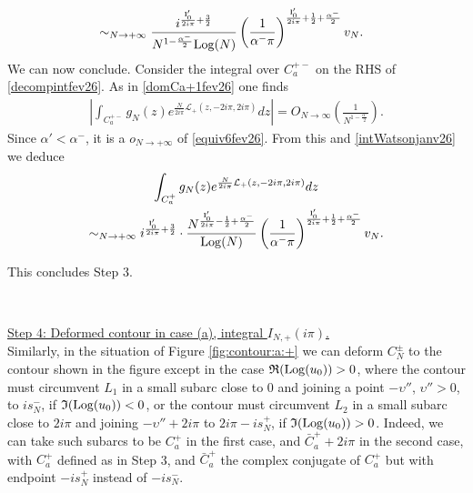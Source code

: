 \documentclass[11pt]{amsart}
\newcommand{\Log}{{\rm Log}}
\begin{document}
{\begin{align}
\notag
\\ & \sim_{N\to +\infty} \dfrac{i^{\frac{{\bf l}_0'}{2i\pi}+\frac{3}{2}}}{N^{1-\frac{\alpha^-}{2}}\Log(N)}\left(\frac{1}{\alpha^-\pi}\right)^{\frac{{\bf l}_0'}{2i\pi}+\frac{1}{2}+ \frac{\alpha^-}{2}}v_N.\label{equiv6fev26}
\end{align}
We can now conclude. Consider the integral over $C_a^{+-}$ on the RHS of \eqref{decompintfev26}. As in \eqref{domCa+1fev26} one finds
\begin{align*}\left \vert \int_{C_a^{+-}} g_N(z)e^{\frac{N}{2i\pi}\mathcal{L}_+(z,-2i\pi,2i\pi)}dz\right \vert = O_{N\to\infty}\left (\frac{1}{N^{1-\frac{\alpha'}{2}}}\right ).\end{align*}
Since $\alpha'< \alpha^-$, it is a $o_{N\to +\infty}$ of \eqref{equiv6fev26}. From this and \eqref{intWatsonjanv26} we deduce
\begin{multline}\label{intCa+8fev26}
\int_{C_a^+} g_N(z) e^{\frac{N}{2i\pi}\mathcal{L}_+(z,-2i\pi,2i\pi)}dz \\ \sim_{N\to +\infty} i^{\frac{{\bf l}_0'}{2i\pi}+\frac{3}{2}}\cdot \dfrac{N^{\frac{{\bf l}_0'}{2i\pi}-\frac{1}{2}+\frac{\alpha^-}{2}}}{\Log(N)} \left(\frac{1}{\alpha^-\pi}\right)^{\frac{{\bf l}_0'}{2i\pi}+\frac{1}{2}+ \frac{\alpha^-}{2}}v_N.
\end{multline}}
\smallskip

This concludes Step 3.

\

\underline{Step 4: Deformed contour in case (a), integral $I_{N,+}(i\pi)$.}\\
Similarly, in the situation of Figure \ref{fig:contour:a:+} we can deform $C_N^\pm$ to the contour shown in the figure except in the case $\mathfrak{R}(\Log(u_{0}))>0$, where the contour must circumvent $L_1$ in a small subarc close to $0$ and joining a point $-\upsilon''$, $\upsilon''>0$, to $is_N^-$, if $\mathfrak{I}(\Log(u_{0}))<0$, or the contour must circumvent $L_2$ in a small subarc close to $2i\pi$ and joining $-\upsilon''+2i\pi$ to $2i\pi - is_N^+$, if $\mathfrak{I}(\Log(u_{0}))>0$. Indeed, we can take such subarcs to be $C^+_a$ in the first case, and $\bar{C}^+_a +2i\pi$ in the second case, with $C^+_a$ defined as in Step 3, and $\bar{C}^+_a$ the complex conjugate of $C^+_a$ but with endpoint $-is_N^+$ instead of $-is_N^-$. 
\end{document}
